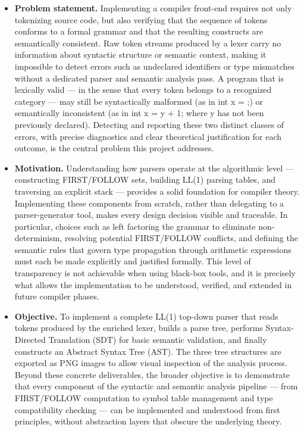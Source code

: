 \documentclass[letterpaper,12pt,oneside]{article}
\begin{document}
\begin{itemize}
    \item \textbf{Problem statement.}
    Implementing a compiler front-end requires not only tokenizing source code, but also verifying that the sequence of tokens conforms to a formal grammar and that the resulting constructs are semantically consistent. Raw token streams produced by a lexer carry no information about syntactic structure or semantic context, making it impossible to detect errors such as undeclared identifiers or type mismatches without a dedicated parser and semantic analysis pass. A program that is lexically valid — in the sense that every token belongs to a recognized  category — may still be syntactically malformed (as in int x = ;) or semantically inconsistent (as in int x = y + 1; where y has not been previously declared). Detecting and reporting these two distinct classes of errors, with precise diagnostics and clear theoretical justification for each outcome, is the central problem this project addresses.


    \item \textbf{Motivation.}
    Understanding how parsers operate at the algorithmic level — constructing FIRST/FOLLOW sets, building LL(1) parsing tables, and traversing an explicit stack — provides a solid foundation for compiler theory.
    Implementing these components from scratch, rather than delegating to a parser-generator tool, makes every design decision visible and traceable.
    In particular, choices such as left factoring the grammar to eliminate non-determinism, resolving potential FIRST/FOLLOW conflicts, and defining the semantic rules that govern type propagation through arithmetic expressions must each be made explicitly and justified formally. This level of transparency is not achievable when using black-box tools, and it is precisely what allows the implementation to be understood, verified, and extended in future compiler phases.


    \item \textbf{Objective.}
    To implement a complete LL(1) top-down parser that reads tokens produced by the enriched lexer, builds a parse tree, performs Syntax-Directed
    Translation (SDT) for basic semantic validation, and finally constructs an Abstract Syntax Tree (AST). The three tree structures are exported as PNG images to allow visual inspection of the analysis process.
    Beyond these concrete deliverables, the broader objective is to
    demonstrate that every component of the syntactic and semantic analysis pipeline — from FIRST/FOLLOW computation to symbol table management and type compatibility checking — can be implemented and understood from first principles, without abstraction layers that obscure the underlying theory.

\end{itemize}
\end{document}
